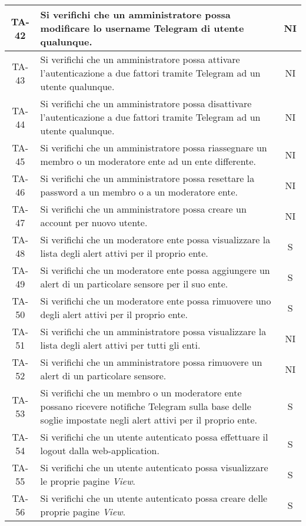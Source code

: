 \begin{center}
\begin{longtable}{|c|p{10cm}|c|}
			 \hline
			 TA-42 & Si verifichi che un amministratore possa modificare lo username Telegram di utente qualunque. & NI \\
			 \hline
			 TA-43 & Si verifichi che un amministratore possa attivare l'autenticazione a due fattori tramite Telegram ad un utente qualunque. & NI \\
			 \hline
			 TA-44 & Si verifichi che un amministratore possa disattivare l'autenticazione a due fattori tramite Telegram ad un utente qualunque. & NI \\
			 \hline
			 TA-45 & Si verifichi che un amministratore possa riassegnare un membro o un moderatore ente ad un ente differente. & NI \\
			 \hline
			 TA-46 & Si verifichi che un amministratore possa resettare la password a un membro o a un moderatore ente. & NI \\
			 \hline
			 TA-47 & Si verifichi che un amministratore possa creare un account per nuovo utente. & NI \\
			 \hline
			 TA-48 & Si verifichi che un moderatore ente possa visualizzare la lista degli alert attivi per il proprio ente. & S \\
			 \hline
			 TA-49 & Si verifichi che un moderatore ente possa aggiungere un alert di un particolare sensore per il suo ente. & S \\
			 \hline
			 TA-50 & Si verifichi che un moderatore ente possa rimuovere uno degli alert attivi per il proprio ente. & S \\
			 \hline
			 TA-51 & Si verifichi che un amministratore possa visualizzare la lista degli alert attivi per tutti gli enti. & NI \\
			 \hline
			 TA-52 & Si verifichi che un amministratore possa rimuovere un alert di un particolare sensore. & NI \\
			 \hline
			 TA-53 & Si verifichi che un membro o un moderatore ente possano ricevere notifiche Telegram sulla base delle soglie impostate negli alert attivi per il proprio ente. & S \\
			 \hline
			 TA-54 & Si verifichi che un utente autenticato possa effettuare il logout dalla web-application. & S \\
			 \hline
			 TA-55 & Si verifichi che un utente autenticato possa visualizzare le proprie pagine \textit{View}. & S \\
			 \hline
			 TA-56 & Si verifichi che un utente autenticato possa creare delle proprie pagine \textit{View}. & S \\

\end{longtable}
\end{center}
